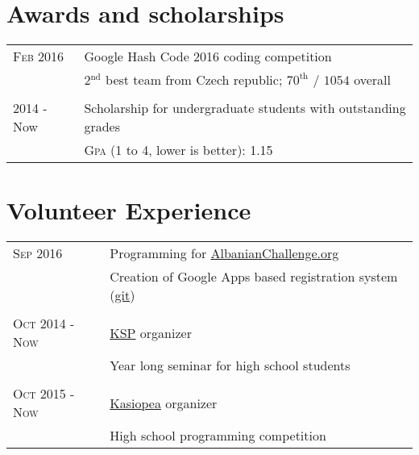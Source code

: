 \documentclass[a4paper,10pt]{article}
\newcommand{\rightcol}{11.2cm}
\newcommand{\leftcol}{2.8cm}
\begin{document}
\section{Awards and scholarships}
\begin{tabular}{p{\leftcol}|p{\rightcol}}

\textsc{Feb} 2016 & {Google Hash Code 2016} coding competition\\
                    & \footnotesize{2$^{\text{nd}}$ best team from Czech republic; $70^{\text{th}}$ / $1054$ overall}\\

\multicolumn{2}{c}{}\\

2014 - Now & Scholarship for undergraduate students with outstanding grades \\
                    & \footnotesize{\textsc{Gpa} (1 to 4, lower is better): 1.15}\\

\end{tabular}


\section{Volunteer Experience}
\begin{tabular}{p{\leftcol}|p{\rightcol}} 

\textsc{Sep 2016} & Programming for \href{http://albanianchallenge.org/}{AlbanianChallenge.org}\\
                &\footnotesize{Creation of Google Apps based registration system (\href{https://github.com/petrroll/ACRegistrationGAS}{git})}\\

\multicolumn{2}{c}{} \\

\textsc{Oct 2014 - Now} & \href{https://ksp.mff.cuni.cz/}{KSP} organizer \\
                        &\footnotesize{Year long seminar for high school students}\\

\multicolumn{2}{c}{} \\

\textsc{Oct 2015 - Now} & \href{https://kasiopea.matfyz.cz/}{Kasiopea} organizer \\
                        &\footnotesize{High school programming competition}\\
\end{tabular}
\end{document}

